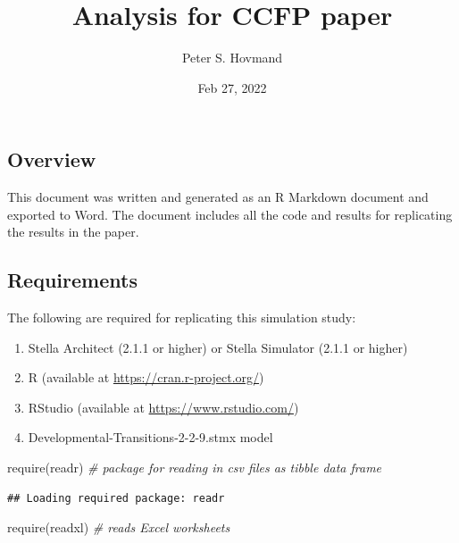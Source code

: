 \documentclass[
]{article}
\title{Analysis for CCFP paper}
\author{Peter S. Hovmand}
\date{Feb 27, 2022}
\newenvironment{Shaded}{\begin{snugshade}}{\end{snugshade}}
\newcommand{\CommentTok}[1]{\textcolor[rgb]{0.56,0.35,0.01}{\textit{#1}}}
\newcommand{\FunctionTok}[1]{\textcolor[rgb]{0.00,0.00,0.00}{#1}}
\newcommand{\NormalTok}[1]{#1}
\providecommand{\tightlist}{%
  \setlength{\itemsep}{0pt}\setlength{\parskip}{0pt}}
\begin{document}
\maketitle

\hypertarget{overview}{%
\subsection{Overview}\label{overview}}

This document was written and generated as an R Markdown document and
exported to Word. The document includes all the code and results for
replicating the results in the paper.

\hypertarget{requirements}{%
\subsection{Requirements}\label{requirements}}

The following are required for replicating this simulation study:

\begin{enumerate}
\def\labelenumi{\arabic{enumi}.}
\tightlist
\item
  Stella Architect (2.1.1 or higher) or Stella Simulator (2.1.1 or
  higher)
\item
  R (available at \url{https://cran.r-project.org/})
\item
  RStudio (available at \url{https://www.rstudio.com/})
\item
  Developmental-Transitions-2-2-9.stmx model
\end{enumerate}

\begin{Shaded}
\begin{Highlighting}[]
\FunctionTok{require}\NormalTok{(readr)    }\CommentTok{\# package for reading in csv files as tibble data frame}
\end{Highlighting}
\end{Shaded}

\begin{verbatim}
## Loading required package: readr
\end{verbatim}

\begin{Shaded}
\begin{Highlighting}[]
\FunctionTok{require}\NormalTok{(readxl)   }\CommentTok{\# reads Excel worksheets}
\end{Highlighting}
\end{Shaded}
\end{document}
